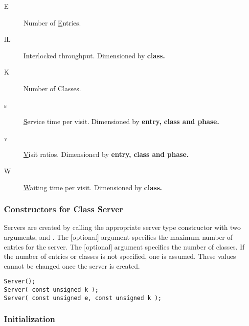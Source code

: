\begin{description}
\item[E] \texonly{---} Number of \underline{E}ntries.
\item[IL] \texonly{---} Interlocked throughput.  Dimensioned by \bf{class}.
\item[K] \texonly{---} Number of Classes.
\item[s] \texonly{---} \underline{S}ervice time per visit.  Dimensioned by
  \bf{entry}, \bf{class} and \bf{phase}.
\item[v] \texonly{---} \underline{V}isit ratios. Dimensioned by
  \bf{entry}, \bf{class} and \bf{phase}.
\item[W] \texonly{---} \underline{W}aiting time per visit.  Dimensioned by \bf{class}.
\end{description}

\subsubsection{Constructors for Class Server}

Servers are created by calling the appropriate server type constructor
with two arguments,  and .  The [optional] 
argument specifies the maximum number of entries for the server.  The
[optional]  argument specifies the number of classes.  If the
number of entries or classes is not specified, one is assumed.  These
values cannot be changed once the server is created.

\begin{verbatim}
Server();
Server( const unsigned k );
Server( const unsigned e, const unsigned k );
\end{verbatim}


\subsubsection{Initialization}
\label{sec:server-initialization}

